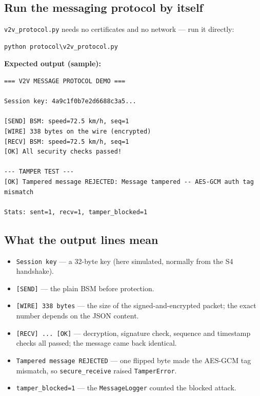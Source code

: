 \documentclass[11pt,a4paper]{article}
\begin{document}
\subsection{Run the messaging protocol by itself}
\texttt{v2v\_protocol.py} needs no certificates and no network --- run it directly:
\begin{lstlisting}[style=term]
python protocol\v2v_protocol.py
\end{lstlisting}

\noindent\textbf{Expected output (sample):}
\begin{lstlisting}[style=term]
=== V2V MESSAGE PROTOCOL DEMO ===

Session key: 4a9c1f0b7e2d6688c3a5...

[SEND] BSM: speed=72.5 km/h, seq=1
[WIRE] 338 bytes on the wire (encrypted)
[RECV] BSM: speed=72.5 km/h, seq=1
[OK] All security checks passed!

--- TAMPER TEST ---
[OK] Tampered message REJECTED: Message tampered -- AES-GCM auth tag mismatch

Stats: sent=1, recv=1, tamper_blocked=1
\end{lstlisting}

\subsection{What the output lines mean}
\begin{itemize}
  \item \texttt{Session key} --- a 32-byte key (here simulated, normally from the
        S4 handshake).
  \item \texttt{[SEND]} --- the plain BSM before protection.
  \item \texttt{[WIRE] 338 bytes} --- the size of the signed-and-encrypted
        packet; the exact number depends on the JSON content.
  \item \texttt{[RECV] ... [OK]} --- decryption, signature check, sequence and
        timestamp checks all passed; the message came back identical.
  \item \texttt{Tampered message REJECTED} --- one flipped byte made the AES-GCM
        tag mismatch, so \texttt{secure\_receive} raised \texttt{TamperError}.
  \item \texttt{tamper\_blocked=1} --- the \texttt{MessageLogger} counted the
        blocked attack.
\end{itemize}
\end{document}
